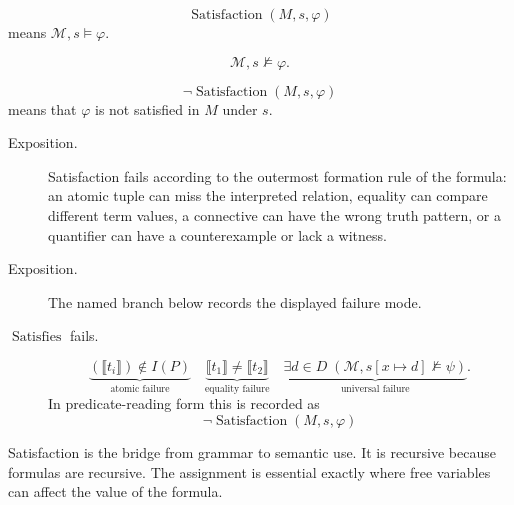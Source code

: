 \begin{remark*}
\[
  \operatorname{Satisfaction}(M,s,\varphi)
\] means
\(\mathcal M,s\models\varphi\).
\end{remark*}

\begin{remark*}
\[
\mathcal M,s\not\models\varphi.
\]
\end{remark*}

\begin{remark*}
\[
  \neg\operatorname{Satisfaction}(M,s,\varphi)
\] means that \(\varphi\) is not
satisfied in \(M\) under \(s\).
\end{remark*}

\begin{remark*}
\begin{description}
  \item[Exposition.] Satisfaction fails according to the outermost formation rule of the formula:
an atomic tuple can miss the interpreted relation, equality can compare
different term values, a connective can have the wrong truth pattern, or a
quantifier can have a counterexample or lack a witness.
\end{description}
\end{remark*}

\begin{remark*}
\begin{description}
  \item[Exposition.] The named branch below records the displayed failure mode.
\item[\(\operatorname{Satisfies}\) fails.] \[
\underbrace{(\llbracket t_i\rrbracket)\notin I(P)}_{\text{atomic failure}}
\quad
\underbrace{\llbracket t_1\rrbracket\neq\llbracket t_2\rrbracket}_{\text{equality failure}}
\quad
\underbrace{\exists d\in D\;(\mathcal M,s[x\mapsto d]\not\models\psi)}_{\text{universal failure}}.
\]
  In predicate-reading form this is recorded as
  \[
    \neg\operatorname{Satisfaction}(M,s,\varphi)
  \]
\end{description}
\end{remark*}

\begin{remark*}[Interpretation]
Satisfaction is the bridge from grammar to semantic use. It is recursive
because formulas are recursive. The assignment is essential exactly where free
variables can affect the value of the formula.
\end{remark*}

